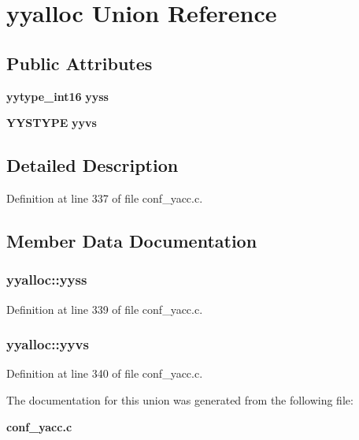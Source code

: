 \section{yyalloc Union Reference}
\label{unionyyalloc}
\subsection*{Public Attributes}
\begin{CompactItemize}
\item 
{\bf yytype\_\-int16} {\bf yyss}
\item 
{\bf YYSTYPE} {\bf yyvs}
\end{CompactItemize}


\subsection{Detailed Description}


Definition at line 337 of file conf\_\-yacc.c.

\subsection{Member Data Documentation}
\subsubsection[{yyss}]{ {\bf yyalloc::yyss}}\label{unionyyalloc_ad44e4a724037e32eeb58333c516bb45}




Definition at line 339 of file conf\_\-yacc.c.
\subsubsection[{yyvs}]{ {\bf yyalloc::yyvs}}\label{unionyyalloc_9494cc8d8cd0eba1b44ca20fe89de5d2}




Definition at line 340 of file conf\_\-yacc.c.

The documentation for this union was generated from the following file:\begin{CompactItemize}
\item 
{\bf conf\_\-yacc.c}\end{CompactItemize}
